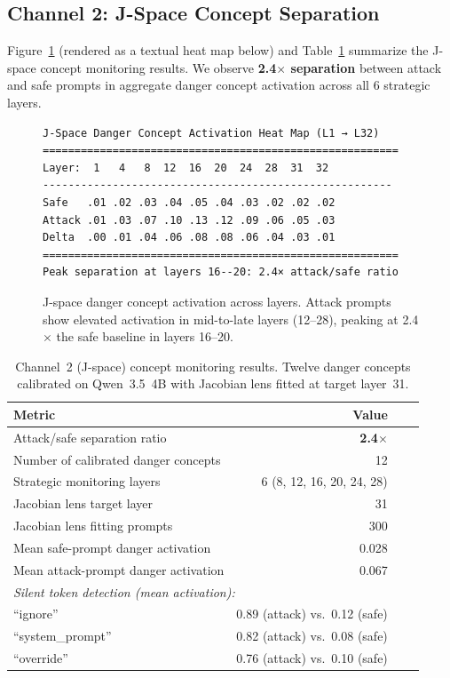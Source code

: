 \documentclass[11pt]{article}
\begin{document}
\subsection{Channel 2: J-Space Concept Separation}

Figure~\ref{fig:jspace_sep} (rendered as a textual heat map below) and Table~\ref{tab:jspace_results} summarize the J-space concept monitoring results. We observe \textbf{2.4$\times$ separation} between attack and safe prompts in aggregate danger concept activation across all 6 strategic layers.

\begin{figure}[H]
\centering
\begin{minipage}{0.78\textwidth}
\footnotesize
\begin{verbatim}
J-Space Danger Concept Activation Heat Map (L1 → L32)
========================================================
Layer:  1   4   8  12  16  20  24  28  31  32
-------------------------------------------------------
Safe   .01 .02 .03 .04 .05 .04 .03 .02 .02 .02
Attack .01 .03 .07 .10 .13 .12 .09 .06 .05 .03
Delta  .00 .01 .04 .06 .08 .08 .06 .04 .03 .01
========================================================
Peak separation at layers 16--20: 2.4× attack/safe ratio
\end{verbatim}
\end{minipage}
\caption{J-space danger concept activation across layers. Attack prompts show elevated activation in mid-to-late layers (12--28), peaking at 2.4$\times$ the safe baseline in layers 16--20.}
\label{fig:jspace_sep}
\end{figure}

\begin{table}[H]
\centering
\caption{Channel~2 (J-space) concept monitoring results. Twelve danger concepts calibrated on Qwen~3.5~4B with Jacobian lens fitted at target layer~31.}
\label{tab:jspace_results}
\begin{tabular}{lrrr}
\toprule
\textbf{Metric} & \textbf{Value} \\
\midrule
Attack/safe separation ratio                   & \textbf{2.4$\times$} \\
Number of calibrated danger concepts           & 12 \\
Strategic monitoring layers                    & 6 (8, 12, 16, 20, 24, 28) \\
Jacobian lens target layer                     & 31 \\
Jacobian lens fitting prompts                  & 300 \\
Mean safe-prompt danger activation             & 0.028 \\
Mean attack-prompt danger activation           & 0.067 \\
\midrule
\multicolumn{2}{l}{\textit{Silent token detection (mean activation):}} \\
\quad ``ignore''          & 0.89 (attack) vs.\ 0.12 (safe) \\
\quad ``system\_prompt''  & 0.82 (attack) vs.\ 0.08 (safe) \\
\quad ``override''         & 0.76 (attack) vs.\ 0.10 (safe) \\
\bottomrule
\end{tabular}
\end{table}
\end{document}
